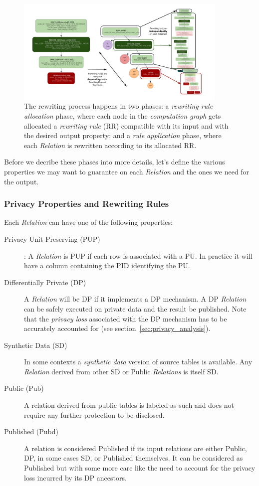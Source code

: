 \documentclass[letterpaper]{article} %
\begin{document}
\begin{figure}[t]
    \centering
    \includegraphics[width=0.9\textwidth]{figures/rewriting} %
    \caption{The rewriting process happens in two phases: a \emph{rewriting rule allocation} phase, where each node in the \emph{computation graph} gets allocated a \emph{rewriting rule} (RR) compatible with its input and with the desired output property; and a \emph{rule application} phase, where each \emph{Relation} is rewritten according to its allocated RR.}
    \label{fig:rewriting}
\end{figure}

Before we decribe these phases into more details, let's define the various properties we may want to guarantee on each \emph{Relation} and the ones we need for the output.

\subsubsection{Privacy Properties and Rewriting Rules}
\label{sec:privacy_properties}

Each \emph{Relation} can have one of the following properties:
\begin{description}
    \item[Privacy Unit Preserving (PUP)]: A \emph{Relation} is PUP if each row is associated with a PU. In practice it will have a column containing the PID identifying the PU.
    \item[Differentially Private (DP)] A \emph{Relation} will be DP if it implements a DP mechanism. A DP \emph{Relation} can be safely  executed on private data and the result be published. Note that the \emph{privacy loss} associated with the DP mechanism has to be accurately accounted for (see section~\ref{sec:privacy_analysis}).
    \item[Synthetic Data (SD)] In some contexts a \emph{synthetic data} version of source tables is available. Any \emph{Relation} derived from other SD or Public \emph{Relations} is itself SD.
    \item[Public (Pub)] A relation derived from public tables is labeled as such and does not require any further protection to be disclosed.
    \item[Published (Pubd)] A relation is considered Published if its input relations are either Public, DP, in some cases SD, or Published themselves. It can be considered as Published but with some more care like the need to account for the privacy loss incurred by its DP ancestors.
\end{description}
\end{document}
